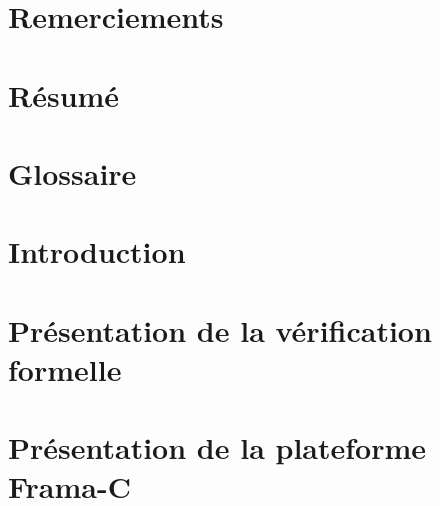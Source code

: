 \documentclass[10pt,french,twoside,a4paper]{report}
\begin{document}
%

\cleardoublepage
{}
\chapter{Remerciements}
\resetsecnumdepth\resettocdepth


\cleardoublepage
{}
\chapter{Résumé}
\resetsecnumdepth\resettocdepth


\cleardoublepage
\tableofcontents

\cleardoublepage
{}
\chapter{Glossaire}
\resetsecnumdepth\resettocdepth
%

\cleardoublepage
{}
\chapter{Introduction}
\resetsecnumdepth\resettocdepth


\cleardoublepage
\chapter{Présentation de la vérification formelle}\label{chapitre_1}


\cleardoublepage
\chapter{Présentation de la plateforme Frama-C}\label{chapitre_2}

\end{document}

